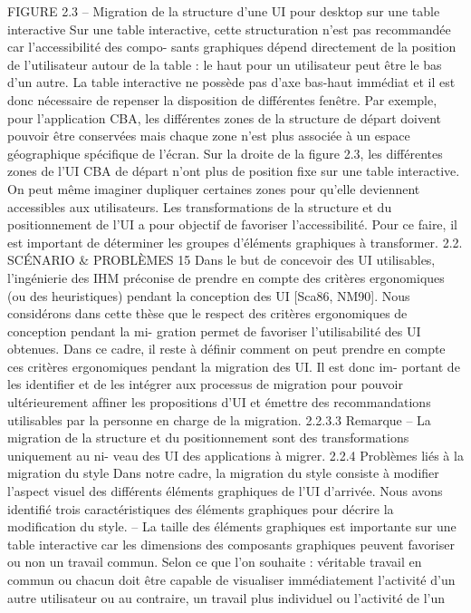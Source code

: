 \documentclass{article}
\begin{document}
FIGURE 2.3 – Migration de la structure d’une UI pour desktop sur une table interactive
Sur une table interactive, cette structuration n’est pas recommandée car l’accessibilité des compo-
sants graphiques dépend directement de la position de l’utilisateur autour de la table : le haut pour un
utilisateur peut être le bas d’un autre. La table interactive ne possède pas d’axe bas-haut immédiat et
il est donc nécessaire de repenser la disposition de différentes fenêtre. Par exemple, pour l’application
CBA, les différentes zones de la structure de départ doivent pouvoir être conservées mais chaque zone
n’est plus associée à un espace géographique spéciﬁque de l’écran. Sur la droite de la ﬁgure 2.3, les
différentes zones de l’UI CBA de départ n’ont plus de position ﬁxe sur une table interactive. On peut
même imaginer dupliquer certaines zones pour qu’elle deviennent accessibles aux utilisateurs.
Les transformations de la structure et du positionnement de l’UI a pour objectif de favoriser
l’accessibilité. Pour ce faire, il est important de déterminer les groupes d’éléments graphiques à
transformer.
2.2. SCÉNARIO & PROBLÈMES
15
Dans le but de concevoir des UI utilisables, l’ingénierie des IHM préconise de prendre en compte
des critères ergonomiques (ou des heuristiques) pendant la conception des UI [Sca86, NM90]. Nous
considérons dans cette thèse que le respect des critères ergonomiques de conception pendant la mi-
gration permet de favoriser l’utilisabilité des UI obtenues. Dans ce cadre, il reste à déﬁnir comment
on peut prendre en compte ces critères ergonomiques pendant la migration des UI. Il est donc im-
portant de les identiﬁer et de les intégrer aux processus de migration pour pouvoir ultérieurement
afﬁner les propositions d’UI et émettre des recommandations utilisables par la personne en charge de
la migration.
2.2.3.3
Remarque
– La migration de la structure et du positionnement sont des transformations uniquement au ni-
veau des UI des applications à migrer.
2.2.4
Problèmes liés à la migration du style
Dans notre cadre, la migration du style consiste à modiﬁer l’aspect visuel des différents éléments
graphiques de l’UI d’arrivée. Nous avons identiﬁé trois caractéristiques des éléments graphiques pour
décrire la modiﬁcation du style.
– La taille des éléments graphiques est importante sur une table interactive car les dimensions
des composants graphiques peuvent favoriser ou non un travail commun. Selon ce que l’on
souhaite : véritable travail en commun ou chacun doit être capable de visualiser immédiatement
l’activité d’un autre utilisateur ou au contraire, un travail plus individuel ou l’activité de l’un
\end{document}
